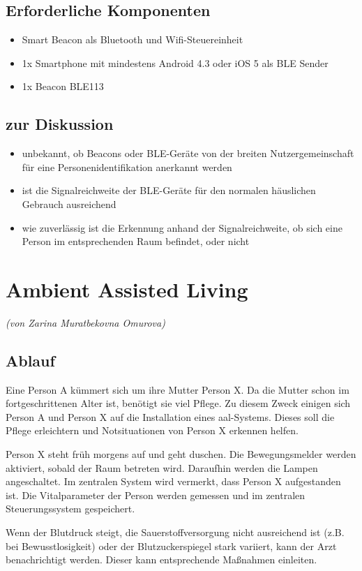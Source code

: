 \subsection{Erforderliche Komponenten}
\begin{itemize}
	\item Smart Beacon als Bluetooth und Wifi-Steuereinheit
	\item 1x Smartphone mit mindestens Android 4.3 oder iOS 5 als BLE Sender
	\item 1x Beacon BLE113
\end{itemize}

\subsection{zur Diskussion}
\begin{itemize}
	\item unbekannt, ob Beacons oder BLE-Geräte von der breiten Nutzergemeinschaft für eine Personenidentifikation anerkannt werden
	\item ist die Signalreichweite der BLE-Geräte für den normalen häuslichen Gebrauch ausreichend
	\item wie zuverlässig ist die Erkennung anhand der Signalreichweite, ob sich eine Person im entsprechenden Raum befindet, oder nicht
\end{itemize}

\section{Ambient Assisted Living}
\emph{(von Zarina Muratbekovna Omurova)}
\subsection{Ablauf}
Eine Person A kümmert sich um ihre Mutter Person X. Da die Mutter schon im fortgeschrittenen Alter ist, benötigt sie viel Pflege. Zu diesem Zweck einigen sich Person A und Person X auf die Installation eines \gls{aal}-Systems. Dieses soll die Pflege erleichtern und Notsituationen von Person X erkennen helfen.

Person X steht früh morgens auf und geht duschen. Die Bewegungsmelder werden aktiviert, sobald der Raum betreten wird. Daraufhin werden die Lampen angeschaltet. Im zentralen System wird vermerkt, dass Person X aufgestanden ist. Die Vitalparameter der Person werden gemessen und im zentralen Steuerungssystem gespeichert. 

Wenn der Blutdruck steigt, die Sauerstoffversorgung nicht ausreichend ist (z.B. bei Bewusstlosigkeit) oder der Blutzuckerspiegel stark variiert, kann der Arzt benachrichtigt werden. Dieser kann entsprechende Maßnahmen einleiten. 

